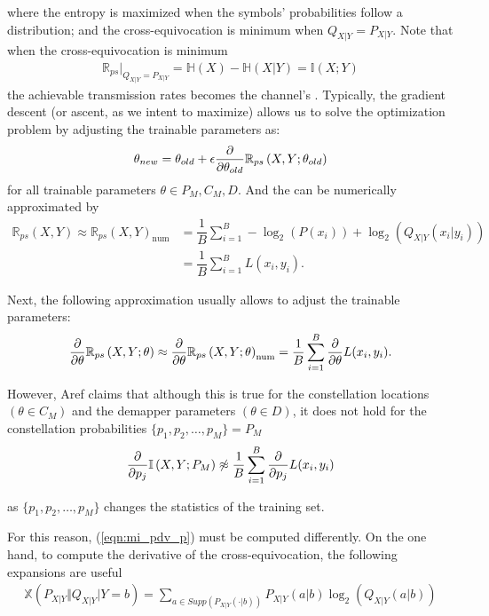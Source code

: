 where the entropy is maximized when the symbols' probabilities follow a  distribution; and the cross-equivocation is minimum when $Q_{X|Y} = P_{X|Y}$. Note that when the cross-equivocation is minimum
\begin{align}
	\mathbb{R}_{ps}|_{Q_{X|Y} = P_{X|Y}} = \mathbb{H}(X) - \mathbb{H}(X|Y) = \mathbb{I}(X;Y)
\end{align}
the achievable transmission rates becomes the channel's .
Typically, the gradient descent (or ascent, as we intent to maximize) allows us to solve the optimization problem by adjusting the trainable parameters as:
\begin{align}
	\theta_{new} = \theta_{old} + \epsilon \pdv{\theta_{old}} \mathbb{R}_{ps}\left(X , Y ; \theta_{old} \right)
\end{align}
for all trainable parameters $\theta \in P_M, C_M, D$. And the  can be numerically approximated by
\begin{align}
	\mathbb{R}_{ps} \left(X , Y\right) \approx \mathbb{R}_{ps} \left(X , Y\right)_{\text{num}} &= \dfrac{1}{B} \sum \limits_{i = 1}^{B} - \log_2(P(x_i)) + \log_2(Q_{X|Y}(x_i|y_i))\\
	&= \dfrac{1}{B} \sum \limits_{i = 1}^{B} L(x_i, y_i).
\end{align}

Next, the following approximation usually allows to adjust the trainable parameters:
\begin{align}
	\pdv{\theta} \mathbb{R}_{ps} \left(X , Y ; \theta \right) \approx \pdv{\theta} \mathbb{R}_{ps} \left(X , Y;\theta  \right)_{\text{num}} = \dfrac{1}{B} \sum \limits_{i = 1}^{B} \pdv{\theta} L(x_i, y_i).
\end{align}

However, Aref claims that although this is true for the constellation locations $(\theta \in C_M)$ and the demapper parameters $(\theta \in D)$, it does not hold for the constellation probabilities $\{p_1, p_2, \dots, p_M\} = P_M$
\begin{align}
\label{eqn:mi_pdv_p}
	\pdv{p_j} \mathbb{I} \left(X , Y ; P_M \right) \not\approx \dfrac{1}{B} \sum \limits_{i = 1}^{B} \pdv{p_j} L(x_i, y_i)
\end{align}

as $\{p_1, p_2, \dots, p_M\}$ changes the statistics of the training set.

For this reason, (\ref{eqn:mi_pdv_p}) must be computed differently. On the one hand, to compute the derivative of the cross-equivocation, the following expansions are useful
\begin{align}
	\mathbb{X}\left(P_{X|Y} \Vert Q_{X|Y} \vert Y=b \right) = \sum \limits_{a \in Supp(P_{X|Y}(\cdot|b))} P_{X|Y}(a|b) \log_2(Q_{X|Y}(a|b))
\end{align}

